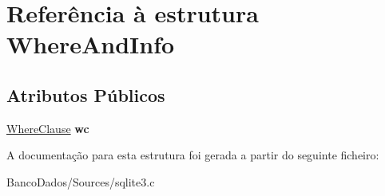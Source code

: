 \hypertarget{struct_where_and_info}{\section{Referência à estrutura Where\-And\-Info}
\label{struct_where_and_info}
}
\subsection*{Atributos Públicos}
\begin{DoxyCompactItemize}
\item 
\hypertarget{struct_where_and_info_a01cea99f069b1e598004a1cd0d0c3a80}{\hyperlink{struct_where_clause}{Where\-Clause} {\bfseries wc}}\label{struct_where_and_info_a01cea99f069b1e598004a1cd0d0c3a80}

\end{DoxyCompactItemize}


A documentação para esta estrutura foi gerada a partir do seguinte ficheiro\-:\begin{DoxyCompactItemize}
\item 
Banco\-Dados/\-Sources/sqlite3.\-c\end{DoxyCompactItemize}
